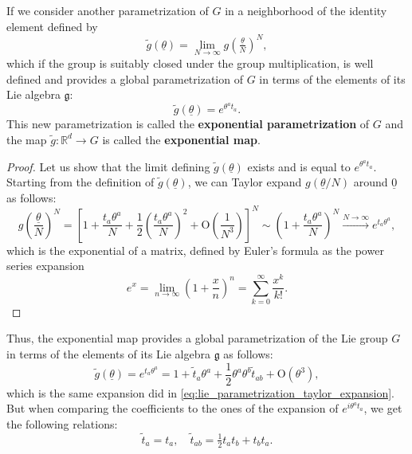 If we consider another parametrization of \(G\) in a neighborhood of the identity element defined by
\[
    \tilde{g}(\underline{\theta}) = \lim_{N \to \infty} g\left(\tfrac{{\underline{\theta}}}{N}\right)^N,
\]
which if the group is suitably closed under the group multiplication, is well defined and provides a global parametrization of \(G\) in terms of the elements of its Lie algebra \(\mathfrak{g}\):
\[
    \tilde{g}(\underline{\theta}) = e^{\theta^a t_a}.
\]
This new parametrization is called the \textbf{exponential parametrization} of \(G\) and the map \(\tilde{g} : \mathbb{R}^d \to G\) is called the \textbf{exponential map}.

\begin{proof}
    Let us show that the limit defining \(\tilde{g}(\underline{\theta})\) exists and is equal to \(e^{\theta^a t_a}\). Starting from the definition of \(\tilde{g}(\underline{\theta})\), we can Taylor expand \(g\left(\underline{\theta} / N\right)\) around \(\underline{0}\) as follows:
    \[
        g\left(\frac{{\underline{\theta}}}{N}\right)^N = \left[ 1 + \frac{t_a \theta^a}{N} + \frac{1}{2} \left( \frac{t_a \theta^a}{N} \right)^2 + \mathrm{O}\left(\frac{1}{N^3}\right) \right]^N \sim \left(1 +  \frac{t_a \theta^a}{N}\right)^N \xrightarrow{N \to \infty} e^{t_a \theta^a},
    \]
    which is the exponential of a matrix, defined by Euler's formula as the power series expansion
    \[
        e^{x} = \lim_{n \to \infty} (1 + \frac{x}{n})^n = \sum_{k=0}^\infty \frac{x^k}{k!}.
    \]
\end{proof}

Thus, the exponential map provides a global parametrization of the Lie group \(G\) in terms of the elements of its Lie algebra \(\mathfrak{g}\) as follows:
\[
    \tilde{g}(\underline{\theta}) = e^{t_a \theta^a} = 1 + \tilde{t}_a \theta^a + \frac{1}{2} \theta^a \theta^b \tilde{t}_{ab}  + \mathrm{O}(\theta^3),
\]
which is the same expansion did in \eqref{eq:lie_parametrization_taylor_expansion}. But when comparing the coefficients to the ones of the expansion of \(e^{i \theta^a t_a}\), we get the following relations:
\[
    \tilde{t}_a = t_a, \quad \tilde{t}_{ab} = \tfrac{1}{2} t_a t_b + t_b t_a.
\]

